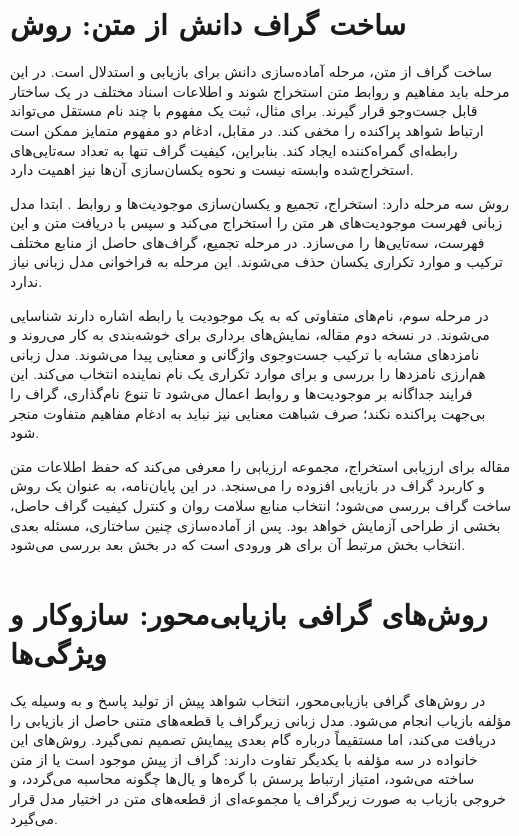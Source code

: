 \section{ساخت گراف دانش از متن: روش }

ساخت گراف از متن، مرحله آماده‌سازی دانش برای بازیابی و استدلال است. در این مرحله باید مفاهیم و روابط متن استخراج شوند و اطلاعات اسناد مختلف در یک ساختار قابل جست‌وجو قرار گیرند. برای مثال، ثبت یک مفهوم با چند نام مستقل می‌تواند ارتباط شواهد پراکنده را مخفی کند. در مقابل، ادغام دو مفهوم متمایز ممکن است رابطه‌ای گمراه‌کننده ایجاد کند. بنابراین، کیفیت گراف تنها به تعداد سه‌تایی‌های استخراج‌شده وابسته نیست و نحوه یکسان‌سازی آن‌ها نیز اهمیت دارد.

روش  سه مرحله دارد: استخراج، تجمیع و یکسان‌سازی موجودیت‌ها و روابط \cite{mo2025kggen}. ابتدا مدل زبانی فهرست موجودیت‌های هر متن را استخراج می‌کند و سپس با دریافت متن و این فهرست، سه‌تایی‌ها را می‌سازد. در مرحله تجمیع، گراف‌های حاصل از منابع مختلف ترکیب و موارد تکراری یکسان حذف می‌شوند. این مرحله به فراخوانی مدل زبانی نیاز ندارد.

در مرحله سوم، نام‌های متفاوتی که به یک موجودیت یا رابطه اشاره دارند شناسایی می‌شوند. در نسخه دوم مقاله، نمایش‌های برداری برای خوشه‌بندی به کار می‌روند و نامزدهای مشابه با ترکیب جست‌وجوی واژگانی و معنایی پیدا می‌شوند. مدل زبانی هم‌ارزی نامزدها را بررسی و برای موارد تکراری یک نام نماینده انتخاب می‌کند. این فرایند جداگانه بر موجودیت‌ها و روابط اعمال می‌شود تا تنوع نام‌گذاری، گراف را بی‌جهت پراکنده نکند؛ صرف شباهت معنایی نیز نباید به ادغام مفاهیم متفاوت منجر شود.

مقاله برای ارزیابی استخراج، مجموعه ارزیابی  را معرفی می‌کند که حفظ اطلاعات متن و کاربرد گراف در بازیابی افزوده را می‌سنجد. در این پایان‌نامه،  به عنوان یک روش ساخت گراف بررسی می‌شود؛ انتخاب منابع سلامت روان و کنترل کیفیت گراف حاصل، بخشی از طراحی آزمایش خواهد بود. پس از آماده‌سازی چنین ساختاری، مسئله بعدی انتخاب بخش مرتبط آن برای هر ورودی است که در بخش بعد بررسی می‌شود.

\section{روش‌های گرافی بازیابی‌محور: سازوکار و ویژگی‌ها}

در روش‌های گرافی بازیابی‌محور، انتخاب شواهد پیش از تولید پاسخ و به وسیله یک مؤلفه بازیاب انجام می‌شود. مدل زبانی زیرگراف یا قطعه‌های متنی حاصل از بازیابی را دریافت می‌کند، اما مستقیماً درباره گام بعدی پیمایش تصمیم نمی‌گیرد. روش‌های این خانواده در سه مؤلفه با یکدیگر تفاوت دارند: گراف از پیش موجود است یا از متن ساخته می‌شود، امتیاز ارتباط پرسش با گره‌ها و یال‌ها چگونه محاسبه می‌گردد، و خروجی بازیاب به صورت زیرگراف یا مجموعه‌ای از قطعه‌های متن در اختیار مدل قرار می‌گیرد.

